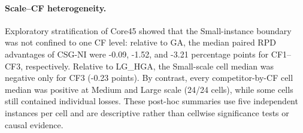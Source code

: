 \paragraph{Scale--CF heterogeneity.} Exploratory stratification of Core45 showed that the Small-instance boundary was not confined to one CF level: relative to GA, the median paired RPD advantages of CSG-NI were -0.09, -1.52, and -3.21 percentage points for CF1--CF3, respectively. Relative to LG\_HGA, the Small-scale cell median was negative only for CF3 (-0.23 points). By contrast, every competitor-by-CF cell median was positive at Medium and Large scale (24/24 cells), while some cells still contained individual losses. These post-hoc summaries use five independent instances per cell and are descriptive rather than cellwise significance tests or causal evidence.

